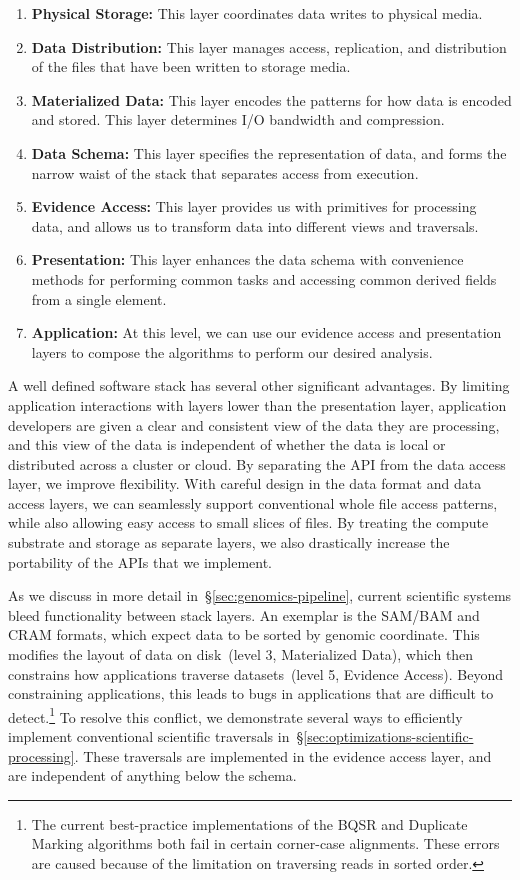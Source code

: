 \documentclass{acm_proc_article-sp}
\begin{document}
\begin{enumerate}
\item {\bf Physical Storage:} This layer coordinates data writes to physical media.
\item {\bf Data Distribution:} This layer manages access, replication, and distribution of the files that have
been written to storage media.
\item {\bf Materialized Data:} This layer encodes the patterns for how data is encoded and stored. This
layer determines I/O bandwidth and compression.
\item {\bf Data Schema:} This layer specifies the representation of data, and forms the narrow waist of
the stack that separates access from execution.
\item {\bf Evidence Access:} This layer provides us with primitives for processing data, and allows us to
transform data into different views and traversals.
\item {\bf Presentation:} This layer enhances the data schema with convenience methods for performing
common \linebreak tasks and accessing common derived fields from a single element.
\item {\bf Application:} At this level, we can use our evidence access and presentation layers to compose
the algorithms to perform our desired analysis.
\end{enumerate}

A well defined software stack has several other significant advantages. By limiting application
interactions with layers lower than the presentation layer, application developers are given a clear and
consistent view of the data they are processing, and this view of the data is independent of whether the
data is local or distributed across a cluster or cloud. By separating the API from the data access layer,
we improve flexibility. With careful design in the data format and data access layers, we can seamlessly
support conventional whole file access patterns, while also allowing easy access to small slices of files.
By treating the compute substrate and storage as separate layers, we also drastically increase
the portability of the APIs that we implement.

As we discuss in more detail in~\S\ref{sec:genomics-pipeline}, current scientific systems bleed
functionality between stack layers. An exemplar is the SAM/BAM and CRAM formats, which expect data
to be sorted by genomic coordinate. This modifies the layout of data on disk~(level 3, Materialized Data),
which then constrains how applications traverse datasets~(level 5, Evidence Access). Beyond
constraining applications, this leads to bugs in applications that are difficult to detect.\footnote{The
current best-practice implementations of the BQSR and Duplicate Marking algorithms both fail in certain
corner-case alignments. These errors are caused because of the limitation on traversing reads in sorted
order.} To resolve this conflict, we demonstrate several ways to efficiently implement conventional scientific
traversals in~\S\ref{sec:optimizations-scientific-processing}. These traversals are implemented in the
evidence access layer, and are independent of anything below the schema.
\end{document}
